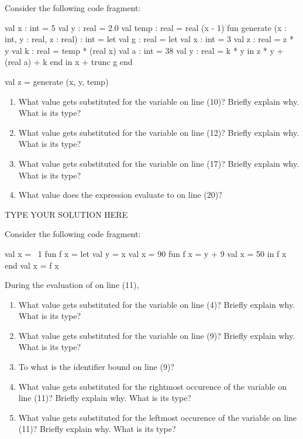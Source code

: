 \documentclass[11pt]{article}
\begin{document}
\begin{task}{6} %
Consider the following code fragment:
\begin{sml}[numbers=left]
val x : int = 5
val y : real = 2.0
val temp : real = real (x - 1)
fun generate (x : int, y : real, z : real) : int =
  let
    val g : real =
      let
        val x : int = 3
        val z : real = z * y
        val k : real = temp * (real x) 
        val a : int = 38
        val y : real = k * y
      in
        z * y + (real a) + k
      end
  in
    x + trunc g
  end

val z = generate (x, y, temp)
\end{sml}

\begin{enumerate}
\item%
  What value gets substituted for the variable  on line (10)?  Briefly
  explain why.  What is its type?
\item%
  What value gets substituted for the variable  on line (12)?  Briefly
  explain why.  What is its type?
\item%
  What value gets substituted for the variable  on line (17)?  Briefly
  explain why.  What is its type?
\item%
  What value does the expression  evaluate to on
  line (20)?
\end{enumerate}
\end{task}

\begin{solution}
TYPE YOUR SOLUTION HERE
\end{solution}


\begin{task}{7} %
Consider the following code fragment:
\begin{sml}[numbers=left]
val x = ~1
fun f x =
    let
      val y = x
      val x = 90
      fun f x = y + 9
      val x = 50
    in
      f x
    end
val x = f x
\end{sml}

During the evaluation of  on line (11),
\begin{enumerate}
\item%
  What value gets substituted for the variable  on line (4)?  Briefly
  explain why.  What is its type?
\item%
  What value gets substituted for the variable  on line (9)?  Briefly
  explain why.  What is its type?
\item%
  To what is the identifier  bound on line (9)?
\item%
  What value gets substituted for the rightmost occurence of the variable
   on line (11)?  Briefly explain why.  What is its type?
\item%
  What value gets substituted for the leftmost occurence of the variable
   on line (11)?  Briefly explain why.  What is its type?
\end{enumerate}
\end{task}
\end{document}
